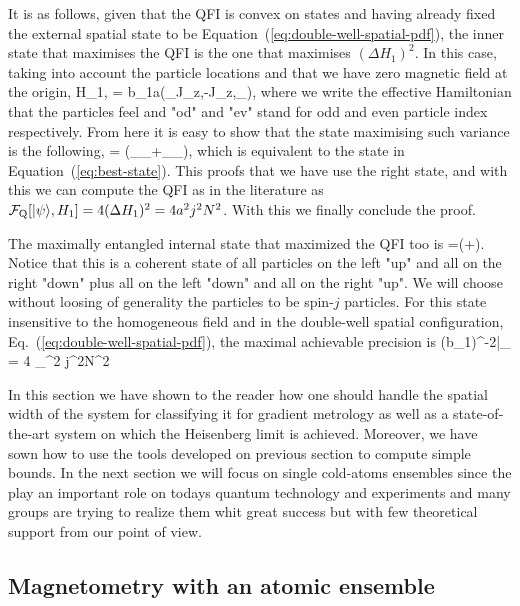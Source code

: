 It is as follows, given that the QFI is convex on states and having already fixed the external spatial state to be Equation~(\ref{eq:double-well-spatial-pdf}), the inner state that maximises the QFI is the one that maximises $(\Delta H_1)^2$.
In this case, taking into account the particle locations and that we have zero magnetic field at the origin,
\be
  H_{1,} = b_1a(\mtxid_{}\otimes J_{z,}-J_{z,}\otimes \mtxid_{}),
\ee
where we write the effective Hamiltonian that the particles feel and "od" and "ev" stand for odd and even particle index respectively.
From here it is easy to show that the state maximising such variance is the following,
\be
  \ket{\psi} = (_{}\otimes{}_{}+_{}\otimes{}_{}),
\ee
which is equivalent to the state in Equation~(\ref{eq:best-state}).
This proofs that we have use the right state, and with this we can compute the QFI as in the literature as $\mathcal{F}_{\text{Q}}[\vert \psi \rangle, H_1] = 4(\Delta H_1)^2 = 4a^2j^2N^2$.
With this we finally conclude the proof.

The maximally entangled internal state that maximized the QFI too is
\be
  \label{eq:best-state}
  \ket{\psi}=(+).
\ee
Notice that this is a coherent state of all particles on the left "up" and all on the right "down" plus all on the left "down" and all on the right "up".
We will choose without loosing of generality the particles to be spin-$j$ particles.
For this state insensitive to the homogeneous field and in the double-well spatial configuration, Eq.~(\ref{eq:double-well-spatial-pdf}), the maximal achievable precision is
\be
  (\Delta b_1)^{-2}|_{\max} = 4 \sigma_{}^2 j^2N^2
\ee

In this section we have shown to the reader how one should handle the spatial width of the system for classifying it for gradient metrology as well as a state-of-the-art system on which the Heisenberg limit is achieved. Moreover, we have sown how to use the tools developed on previous section to compute simple bounds. In the next section we will focus on single cold-atoms ensembles since the play an important role on todays quantum technology and experiments and many groups are trying to realize them whit great success but with few theoretical support from our point of view.

\subsection{Magnetometry with an atomic ensemble}
\label{sec:single cloud systems}

